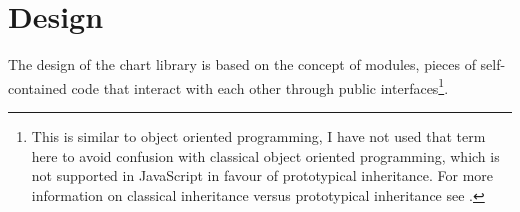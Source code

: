 \chapter{Design}
The design of the chart library is based on the concept of modules, pieces of self-contained code that interact with each other through public interfaces\footnote{This is similar to object oriented programming, I have not used that term here to avoid confusion with classical object oriented programming, which is not supported in JavaScript in favour of prototypical inheritance. For more information on classical inheritance versus prototypical inheritance see 
\cite{crockford08}.}.









